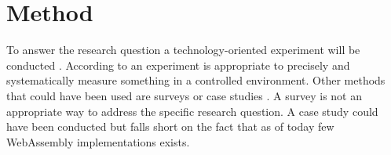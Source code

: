 \section{Method}
\label{method}

To answer the research question a technology-oriented experiment will be conducted \parencite{WohlinRunesonHostOhlssonRegnellWesslen2012}. According to \textcite{WohlinRunesonHostOhlssonRegnellWesslen2012} an experiment is appropriate to precisely and systematically measure something in a controlled environment. Other methods that could have been used are surveys or case studies \parencite{WohlinRunesonHostOhlssonRegnellWesslen2012}. A survey is not an appropriate way to address the specific research question. A case study could have been conducted but falls short on the fact that as of today few WebAssembly implementations exists.






